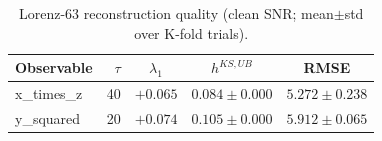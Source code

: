 \begin{table}[ht]
\centering
\begin{tabular}{lrccc}
\hline
Observable & $\tau$ & $\lambda_1$ & $h^{KS,UB}$ & RMSE \\
\hline
x\_times\_z & 40 & $+0.065$ & $0.084\pm0.000$ & $5.272\pm0.238$ \\
y\_squared & 20 & $+0.074$ & $0.105\pm0.000$ & $5.912\pm0.065$ \\
\hline
\end{tabular}
\caption{Lorenz-63 reconstruction quality (clean SNR; mean$\pm$std over K-fold trials).}
\label{tab:lorenz63}
\end{table}
